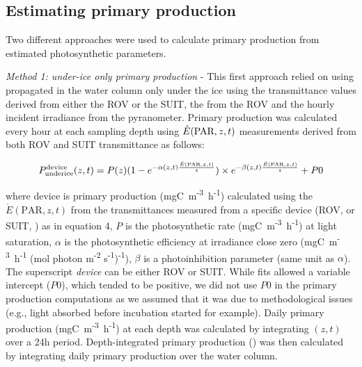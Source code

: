 \subsection{Estimating primary production}

Two different approaches were used to calculate primary production from estimated photosynthetic parameters.

\textit{Method 1: under-ice only primary production} - This first approach relied on using \eparscalar{} propagated in the water column only under the ice using the transmittance values derived from either the ROV or the SUIT, the \kdparscalar{} from the ROV and the hourly incident irradiance from the pyranometer. Primary production was calculated every hour at each sampling depth using $\mathring{E}(\textnormal{PAR}, z, t)$ measurements derived from both ROV and SUIT transmittance as follows:

\begin{linenomath*}
    \begin{equation}
		\ppundericedevice{}(z,t) = P(z)(1 - e^{-\alpha(z,t)\frac{\mathring{E}(\text{PAR}, z, t)}{z}}) \times e^{-\beta(z,t)\frac{\mathring{E}(\text{PAR}, z, t)}{z}} + P0
	\end{equation}
\end{linenomath*}

\noindent where \ppundericedevice{} device is primary production (mgC~m\textsuperscript{-3}~h\textsuperscript{-1}) calculated using the $\mathring{E}(\text{PAR}, z, t)$ from the transmittances measured from a specific device (ROV, \pprovunderice{} or SUIT, \ppsuitunderice{}) as in equation 4, $P$ is the photosynthetic rate (mgC~m\textsuperscript{-3}~h\textsuperscript{-1}) at light saturation, $\alpha$ is the photosynthetic efficiency at irradiance close zero (mgC~m\textsuperscript{-3}~h\textsuperscript{-1} (\textmu mol photon m\textsuperscript{-2} s\textsuperscript{-1})\textsuperscript{-1}), $\beta$ is a photoinhibition parameter (same unit as $\alpha$). The superscript \textit{device} can be either ROV or SUIT. While fits allowed a variable intercept ($P0$), which tended to be positive, we did not use $P0$ in the primary production computations as we assumed that it was due to methodological issues (e.g., light absorbed before incubation started for example). Daily primary production (mgC~m\textsuperscript{-3}~h\textsuperscript{-1}) at each depth was calculated by integrating \ppundericedevice{}$(z,t)$ over a 24h period. Depth-integrated primary production (\dailypp{}) was then calculated by integrating daily primary production over the water column.

